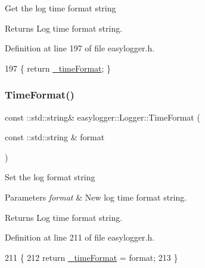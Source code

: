 Get the log time format string

\begin{DoxyReturn}{Returns}
Log time format string. 
\end{DoxyReturn}


Definition at line 197 of file easylogger.\+h.


\begin{DoxyCode}
197 \{ \textcolor{keywordflow}{return} \mbox{\hyperlink{classeasylogger_1_1_logger_a692cc5f57c16a7399d5630b1623bd613}{\_timeFormat}}; \}
\end{DoxyCode}
\mbox{\label{classeasylogger_1_1_logger_a0b0ff3f703f2e6c04e86e8877d5a906c}} 
\subsubsection{\texorpdfstring{Time\+Format()}{TimeFormat()}\hspace{0.1cm}{\footnotesize\ttfamily [2/2]}}
{\footnotesize\ttfamily const \+::std\+::string\& easylogger\+::\+Logger\+::\+Time\+Format (\begin{DoxyParamCaption}\item[{const \+::std\+::string \&}]{format }\end{DoxyParamCaption})\hspace{0.3cm}{\ttfamily [inline]}}

Set the log format string


\begin{DoxyParams}{Parameters}
{\em format} & New log time format string. \\
\hline
\end{DoxyParams}
\begin{DoxyReturn}{Returns}
Log time format string. 
\end{DoxyReturn}


Definition at line 211 of file easylogger.\+h.


\begin{DoxyCode}
211                                                              \{
212             \textcolor{keywordflow}{return} \mbox{\hyperlink{classeasylogger_1_1_logger_a692cc5f57c16a7399d5630b1623bd613}{\_timeFormat}} = format;
213         \}
\end{DoxyCode}
\mbox{\label{classeasylogger_1_1_logger_ac0e7b45cf7f2ce015fd4b510a76bd5b5}} 
